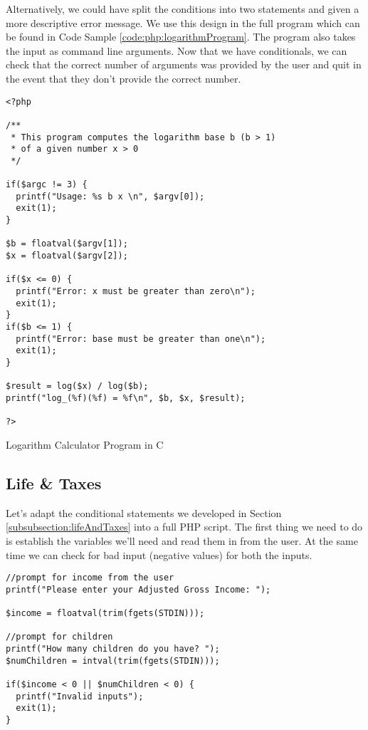 Alternatively, we could have split the conditions into two statements and given
a more descriptive error message.  We use this design in the full program 
which can be found in Code Sample \ref{code:php:logarithmProgram}.  The 
program also takes the input as command line arguments.  Now that we have
conditionals, we can check that the correct number of arguments
was provided by the user and quit in the event that they don't provide
the correct number.

\begin{listing}[h]
\begin{verbatim}
<?php

/**
 * This program computes the logarithm base b (b > 1)
 * of a given number x > 0
 */

if($argc != 3) {
  printf("Usage: %s b x \n", $argv[0]);
  exit(1);
}

$b = floatval($argv[1]);
$x = floatval($argv[2]);

if($x <= 0) {
  printf("Error: x must be greater than zero\n");
  exit(1);
}
if($b <= 1) {
  printf("Error: base must be greater than one\n");
  exit(1);
}

$result = log($x) / log($b);
printf("log_(%f)(%f) = %f\n", $b, $x, $result);

?>
\end{verbatim}
\caption{Logarithm Calculator Program in C}
\label{code:php:logarithmProgram}
\end{listing}

\subsection{Life \& Taxes}

Let's adapt the conditional statements we developed in Section \ref{subsubsection:lifeAndTaxes}
into a full PHP script.  The first thing we need to do is establish the variables we'll need and
read them in from the user.  At the same time we can check for bad input (negative values)
for both the inputs.

\begin{verbatim}
//prompt for income from the user
printf("Please enter your Adjusted Gross Income: ");

$income = floatval(trim(fgets(STDIN)));

//prompt for children
printf("How many children do you have? ");
$numChildren = intval(trim(fgets(STDIN)));

if($income < 0 || $numChildren < 0) {
  printf("Invalid inputs");
  exit(1);
}
\end{verbatim}

